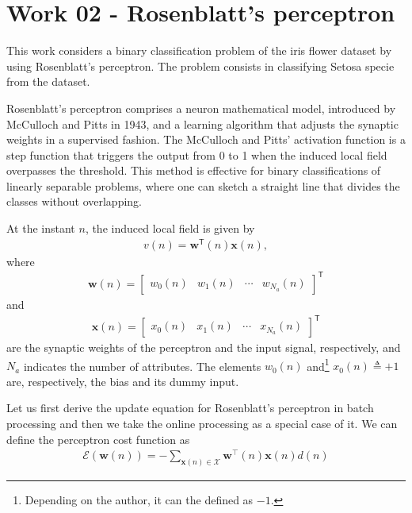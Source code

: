 \documentclass[12pt,a4paper]{article}
\newcommand{\trans}{\mathsf{T}}
\begin{document}

\section{Work 02 - Rosenblatt's perceptron}

This work considers a binary classification problem of the iris flower dataset by using Rosenblatt's perceptron. The problem consists in classifying Setosa specie from the dataset.

Rosenblatt's perceptron comprises a neuron mathematical model, introduced by McCulloch and Pitts in 1943, and a learning algorithm that adjusts the synaptic weights in a supervised fashion. The McCulloch and Pitts' activation function is a step function that triggers the output from 0 to 1 when the induced local field overpasses the threshold. This method is effective for binary classifications of linearly separable problems, where one can sketch a straight line that divides the classes without overlapping.

At the instant \(n\), the induced local field is given by
\begin{align}
    v(n) = \mathbf{w}^\trans\left(n\right) \mathbf{x}\left(n\right),
    \label{eq:induced-local-field}
\end{align}
where
\begin{align}
    \mathbf{w}\left(n\right) = \begin{bmatrix}
        w_0(n) & w_1(n) & \cdots & w_{N_a}(n)
    \end{bmatrix}^\trans
\end{align}
and
\begin{align}
    \mathbf{x}\left(n\right) = \begin{bmatrix}
        x_0(n) & x_1(n) & \cdots & x_{N_a}(n)
    \end{bmatrix}^\trans
\end{align}
are the synaptic weights of the perceptron and the input signal, respectively, and \(N_a\) indicates the number of attributes. The elements \(w_0(n)\) and\footnote{Depending on the author, it can the defined as \(-1\).} \(x_0(n) \triangleq +1\) are, respectively, the bias and its dummy input.

Let us first derive the update equation for Rosenblatt's perceptron in batch processing and then we take the online processing as a special case of it. We can define the perceptron cost function as
\begin{align}
    \mathscr{E}\left( \mathbf{w} \left( n \right) \right) = - \sum_{\mathbf{x}(n) \in \mathscr{X}} \mathbf{w}^\top(n) \mathbf{x}(n) d(n)
\end{align}
\end{document}
